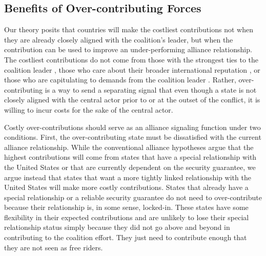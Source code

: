 \documentclass[12pt,letterpaper]{article}
\begin{document}
	\subsection{Benefits of Over-contributing Forces}
		Our theory posits that countries will make the costliest contributions not when they are already closely aligned with the coalition's leader, but when the contribution can be used to improve an under-performing alliance relationship.
		The costliest contributions do not come from those with the strongest ties to the coalition leader \citep{ringsmose_natoburdensharingredux_2010, wolford_showing_2014}, those who care about their broader international reputation \citep{pedersen_bandwagonstatuschanging_2018}, or those who are capitulating to demands from the coalition leader \citep{schweller_newrealistresearch_1997}. Rather, over-contributing is a way to send a separating signal that even though a state is not closely aligned with the central actor prior to or at the outset of the conflict, it is willing to incur costs for the sake of the central actor.

		Costly over-contributions should serve as an alliance signaling function under two conditions. First, the over-contributing state must be dissatisfied with the current alliance relationship. While the conventional alliance hypotheses argue that the highest contributions will come from states that have a special relationship with the United States or that are currently dependent on the security guarantee, we argue instead that states that want a more tightly linked relationship with the United States will make more costly contributions. States that already have a special relationship or a reliable security guarantee do not need to over-contribute because their relationship is, in some sense, locked-in. These states have some flexibility in their expected contributions and are unlikely to lose their special relationship status simply because they did not go above and beyond in contributing to the coalition effort. They just need to contribute enough that they are not seen as free riders. 
\end{document}
